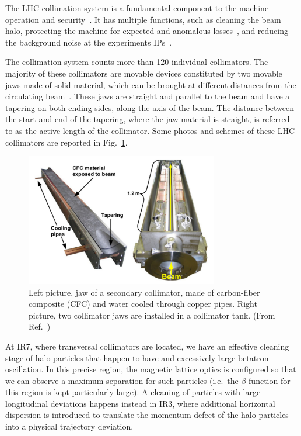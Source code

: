 The LHC collimation system is a fundamental component to the machine operation and security~\cite{1590664, Assmann:972336}. It has multiple functions, such as cleaning the beam halo, protecting the machine for expected and anomalous losses~\cite{BRUCE201719}, and reducing the background noise at the experiments IPs~\cite{Bruce:1646958, Bruce:2686581}.

The collimation system counts more than 120 individual collimators. The majority of these collimators are movable devices constituted by two movable jaws made of solid material, which can be brought at different distances from the circulating beam~\cite{Bertarelli:794628}. These jaws are straight and parallel to the beam and have a tapering on both ending sides, along the axis of the beam. The distance between the start and end of the tapering, where the jaw material is straight, is referred to as the active length of the collimator. Some photos and schemes of these LHC collimators are reported in Fig.~\ref{fig:collimator_pics}.

\begin{figure}[htp]
    \centering
    \includegraphics[width=0.75\textwidth]{5_Diffusion_measurement_LHC/figs/collimator_pics.png}
    \caption{Left picture, jaw of a secondary collimator, made of carbon-fiber composite (CFC) and water cooled through copper pipes. Right picture, two collimator jaws are installed in a collimator tank. (From Ref.~\cite{bruce2014simulations})}
    \label{fig:collimator_pics}
\end{figure}

At IR7, where transversal collimators are located, we have an effective cleaning stage of halo particles that happen to have and excessively large betatron oscillation. In this precise region, the magnetic lattice optics is configured so that we can observe a maximum separation for such particles (i.e.\ the $\beta$ function for this region is kept particularly large). A cleaning of particles with large longitudinal deviations happens instead in IR3, where additional horizontal dispersion is introduced to translate the momentum defect of the halo particles into a physical trajectory deviation.

